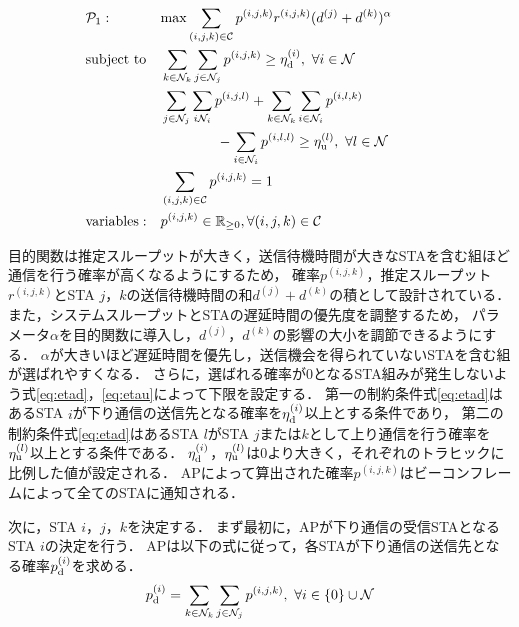 \documentclass[technicalreport]{ieicej}
\newcommand{\pijk}{p^{(i,j,k)}}
\newcommand{\rijk}{r^{(i,j,k)}}
\newcommand{\mthni}{{\mathcal N}_i}
\newcommand{\mthnj}{{\mathcal N}_j}
\newcommand{\mthnk}{{\mathcal N}_k}
\begin{document}
		\begin{align}
			&{\mathcal P}_1: && {\rm max} \sum_{(i,j,k)\in{\mathcal C}} p^{(i,j,k)}r^{(i,j,k)}(d^{(j)}+d^{(k)})^{\alpha} &&&&&&\\
			&{\rm subject\ to} && \sum_{k\in\mthnk} \sum_{j\in\mthnj} p^{(i,j,k)} \geq \eta_{\rm d}^{(i)},\ \forall i\in {\mathcal N} \label{eq:etad} \\
			&&& \sum_{j\in\mthnj} \sum_{i\mthni} p^{(i,j,l)}+\sum_{k\in\mthnk} \sum_{i\in\mthni} p^{(i,l,k)} \nonumber\\
			&&&\qquad\qquad- \sum_{i\in\mthni} p^{(i,l,l)} \geq \eta_{\rm u}^{(l)},\ \forall l\in {\mathcal N} \label{eq:etau} \\
			&&& \sum_{(i,j,k)\in{\mathcal C}} p^{(i,j,k)}=1 \\
			&{\rm variables:} &&p^{(i,j,k)} \in {\mathbb R}_{\geq 0},\forall(i,j,k)\in {\mathcal C}
		\end{align}
		\par
		目的関数は推定スループットが大きく，送信待機時間が大きなSTAを含む組ほど通信を行う確率が高くなるようにするため，
		確率$\pijk$，推定スループット$\rijk$とSTA $j$，$k$の送信待機時間の和$d^{(j)}+d^{(k)}$の積として設計されている．
		また，システムスループットとSTAの遅延時間の優先度を調整するため，
		パラメータ$\alpha$を目的関数に導入し，$d^{(j)}$，$d^{(k)}$の影響の大小を調節できるようにする．
		$\alpha$が大きいほど遅延時間を優先し，送信機会を得られていないSTAを含む組が選ばれやすくなる．
		さらに，選ばれる確率が0となるSTA組みが発生しないよう式\eqref{eq:etad}，\eqref{eq:etau}によって下限を設定する．
		第一の制約条件式\eqref{eq:etad}はあるSTA $i$が下り通信の送信先となる確率を$\eta_{\rm d}^{(i)}$以上とする条件であり，
		第二の制約条件式\eqref{eq:etad}はあるSTA $l$がSTA $j$または$k$として上り通信を行う確率を$\eta_{\rm u}^{(l)}$以上とする条件である．
		$\eta_{\rm d}^{(i)}$，$\eta_{\rm u}^{(l)}$は0より大きく，それぞれのトラヒックに比例した値が設定される．
		APによって算出された確率$\pijk$はビーコンフレームによって全てのSTAに通知される．
		\par
		次に，STA $i$，$j$，$k$を決定する．
		まず最初に，APが下り通信の受信STAとなるSTA $i$の決定を行う．
		APは以下の式に従って，各STAが下り通信の送信先となる確率$p_{\rm d}^{(i)}$を求める．
		\begin{equation}
			p_{\rm d}^{(i)}= \sum_{k\in\mthnk}\sum_{j\in\mthnj}p^{(i,j,k)}, \ \forall i \in \{0\}\cup{\mathcal N}
		\end{equation}
\end{document}
